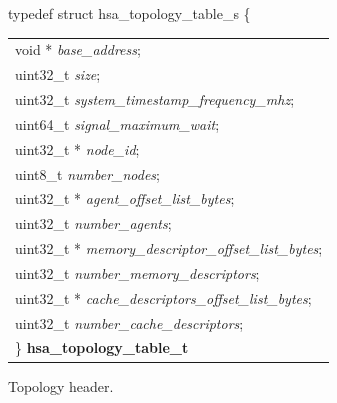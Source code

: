 \documentclass[final]{book}
\newcommand{\reffld}[1]{\textit{#1}}
\begin{document}
\begin{appendices}
\noindent\begin{tcolorbox}[breakable,nobeforeafter,arc=0mm,colframe=white,colback=lightgray,left=0mm]
typedef struct  hsa_topology_table_s \{
\vspace{-3.5mm}\begin{longtable}{@{}p{\textwidth}}
\hspace{1.7em}void * \reffld{base_address};\\
\hspace{1.7em}uint32_t \reffld{size};\\
\hspace{1.7em}uint32_t \reffld{system_timestamp_frequency_mhz};\\
\hspace{1.7em}uint64_t \reffld{signal_maximum_wait};\\
\hspace{1.7em}uint32_t * \reffld{node_id};\\
\hspace{1.7em}uint8_t \reffld{number_nodes};\\
\hspace{1.7em}uint32_t * \reffld{agent_offset_list_bytes};\\
\hspace{1.7em}uint32_t \reffld{number_agents};\\
\hspace{1.7em}uint32_t * \reffld{memory_descriptor_offset_list_bytes};\\
\hspace{1.7em}uint32_t \reffld{number_memory_descriptors};\\
\hspace{1.7em}uint32_t * \reffld{cache_descriptors_offset_list_bytes};\\
\hspace{1.7em}uint32_t \reffld{number_cache_descriptors};\\
\}  \hypertarget{group--topology-1ga2ceebe082e0723e7ca91583a9751a382}{\textbf{hsa_topology_table_t}}
\end{longtable}

\end{tcolorbox}
Topology header.


\end{appendices}
\end{document}
